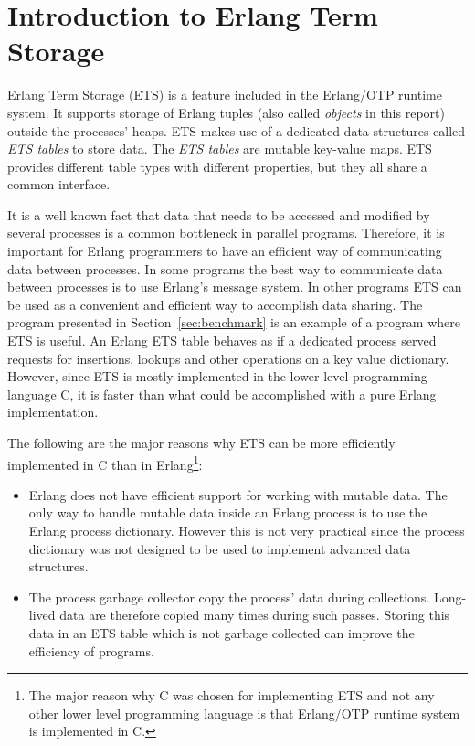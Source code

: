 \documentclass[aps,pre,preprint,nofootinbib]{revtex4}
\begin{document}
\section{Introduction to Erlang Term Storage}

Erlang Term Storage (ETS) is a feature included in the Erlang/OTP runtime system.
It supports storage of Erlang tuples (also called \emph{objects} in this report) outside the processes' heaps.
ETS makes use of a dedicated data structures called \emph{ETS tables} to store data.
The \emph{ETS tables} are mutable key-value maps.
ETS provides different table types with different properties, but they all share a common interface.

It is a well known fact that data that needs to be accessed and modified by several processes is a common bottleneck in parallel programs.
Therefore, it is important for Erlang programmers to have an efficient way of communicating data between processes.
In some programs the best way to communicate data between processes is to use Erlang's message system.
In other programs ETS can be used as a convenient and efficient way to accomplish data sharing. 
The program presented in Section~\ref{sec:benchmark} is an example of a program where ETS is useful.
An Erlang ETS table behaves as if a dedicated process served requests for insertions, lookups and other operations on a key value dictionary.
However, since ETS is mostly implemented in the lower level programming language C, it is faster than what could be accomplished with a pure Erlang implementation.

The following are the major reasons why ETS can be more efficiently implemented in C than in Erlang\footnote{The major reason why C was chosen for implementing ETS and not any other lower level programming language is that Erlang/OTP runtime system is implemented in C.}:
\begin{itemize}
\item
Erlang does not have efficient support for working with mutable data.
The only way to handle mutable data inside an Erlang process is to use the Erlang process dictionary.
However this is not very practical since the process dictionary was not designed to be used to implement advanced data structures.
\item 
The process garbage collector copy the process' data during collections.
Long-lived data are therefore copied many times during such passes. 
Storing this data in an ETS table which is not garbage collected can improve the efficiency of programs.
\end{itemize}
\end{document}
